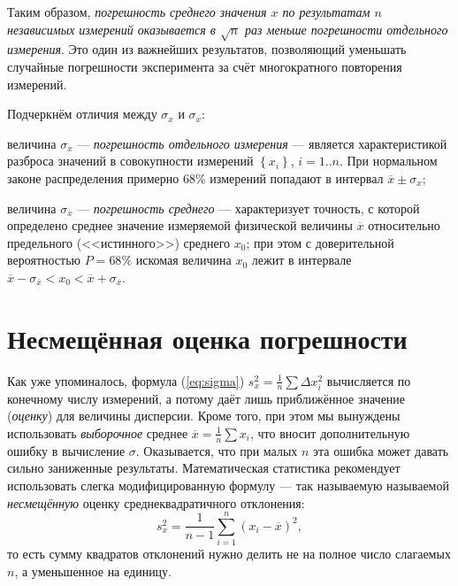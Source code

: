 Таким образом, \emph{погрешность среднего значения $x$ по результатам
$n$ независимых измерений оказывается в $\sqrt{n}$ раз меньше погрешности
отдельного измерения}. Это один из важнейших результатов, позволяющий
уменьшать случайные погрешности эксперимента за счёт многократного
повторения измерений.

Подчеркнём отличия между $\sigma_{x}$ и $\sigma_{\overline{x}}$:

величина $\sigma_{x}$ --- \emph{погрешность отдельного
измерения} --- является характеристикой разброса значений
в совокупности измерений $\left\{ x_{i}\right\} $, $i=1..n$. При
нормальном законе распределения примерно 68\% измерений попадают в
интервал $\overline{x}\pm\sigma_{x}$;

величина $\sigma_{\overline{x}}$ --- \emph{погрешность
среднего} --- характеризует точность, с которой определено
среднее значение измеряемой физической величины $\overline{x}$ относительно
предельного (<<истинного>>) среднего $x_{0}$;
при этом с доверительной вероятностью $P=68\%$ искомая величина $x_{0}$
лежит в интервале $\overline{x}-\sigma_{\overline{x}}<x_{0}<\overline{x}+\sigma_{\overline{x}}$.

\section{Несмещённая оценка погрешности\label{subsec:nesmesch}}


Как уже упоминалось, формула (\ref{eq:sigma}) $s_{x}^{2}=\frac{1}{n}\sum\Delta x_{i}^{2}$
вычисляется по конечному числу измерений, а потому даёт лишь приближённое
значение (\emph{оценку}) для величины дисперсии. Кроме того, при этом
мы вынуждены использовать \emph{выборочное} среднее $\overline{x}=\frac{1}{n}\sum x_{i}$,
что вносит дополнительную ошибку в вычисление $\sigma$. Оказывается,
что при малых $n$ эта ошибка может давать сильно заниженные результаты.
Математическая статистика рекомендует использовать слегка модифицированную
формулу --- так называемую называемой \emph{несмещённую}
оценку среднеквадратичного отклонения:
\begin{equation}
\boxed{s_{x}^{2}=\frac{1}{n-1}\sum\limits _{i=1}^{n}\left(x_{i}-\overline{x}\right)^{2}},\label{eq:sigma_straight}
\end{equation}
то есть сумму квадратов отклонений нужно делить не на полное число
слагаемых $n$, а уменьшенное на единицу.


